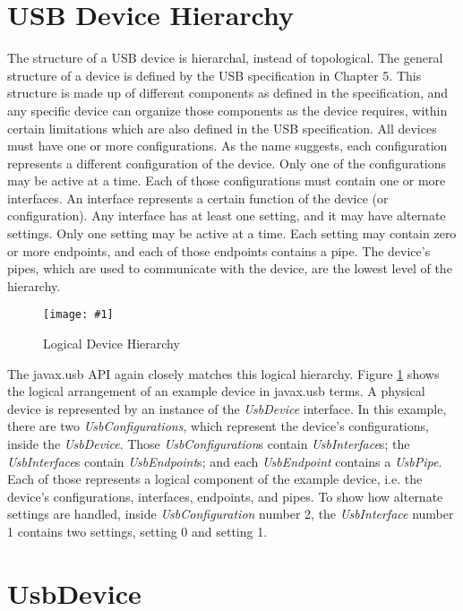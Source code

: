 \documentclass{article}
\newcommand{\myinterface}[1]{\emph{#1}}
\newcommand{\mysectionend}[0]{\vfill\pagebreak[1]}
\newcommand{\myfigure}[3]{\begin{figure}[htbp]\centering\texttt{[image: \#1]}\caption{#2}\label{#3}\end{figure}}
\begin{document}
\section{USB Device Hierarchy}

The structure of a USB device is hierarchal, instead of topological.  The general
structure of a device is defined by the USB specification in Chapter 5.
This structure is made up of different components as defined in the specification,
and any specific device can organize those components as the device requires,
within certain limitations which are also defined in the USB specification.
All devices must have one or more configurations.  As the name suggests,
each configuration represents a different configuration of the device.
Only one of the configurations may be active at a time.  Each of those configurations
must contain one or more interfaces.  An interface represents a certain function
of the device (or configuration).  Any interface has at least one setting,
and it may have alternate settings.  Only one setting may be active at a time.
Each setting may contain zero or more endpoints, and each of those endpoints
contains a pipe.  The device's pipes, which are used to communicate with the
device, are the lowest level of the hierarchy.

\myfigure{figs/logical_device_hierarchy}{Logical Device Hierarchy}{device_hierarchy}

The javax.usb API again closely matches this logical hierarchy.  Figure \ref{device_hierarchy}
shows the logical arrangement of an example device in javax.usb terms.  A physical
device is represented by an instance of the \myinterface{UsbDevice} interface.  In this example,
there are two \myinterface{UsbConfigurations}, which represent the device's configurations,
inside the \myinterface{UsbDevice}.  Those \myinterface{UsbConfiguration}s
contain \myinterface{UsbInterface}s; the \myinterface{UsbInterface}s
contain \myinterface{UsbEndpoint}s; and each \myinterface{UsbEndpoint}
contains a \myinterface{UsbPipe}.  Each of those represents a logical component
of the example device, i.e. the device's configurations, interfaces, endpoints,
and pipes.  To show how alternate settings are handled, inside \myinterface{UsbConfiguration}
number 2, the \myinterface{UsbInterface} number 1 contains two settings, setting 0 and setting 1.

\mysectionend

%

\section{UsbDevice}
\end{document}
